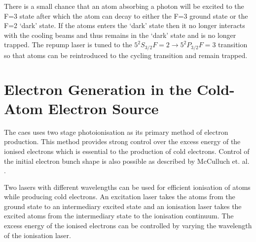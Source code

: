 There is a small chance that an atom absorbing a photon will be excited to the F=3 state after which the atom can decay to either the F=3 ground state or the F=2 `dark' state. If the atoms enters the `dark' state then it no longer interacts with the cooling beams and thus remains in the `dark' state and is no longer trapped. The repump laser is tuned to the $5 ^2 S_{3/2} F=2\rightarrow5 ^2 P_{3/2} F=3$ transition so that atoms can be reintroduced to the cycling transition and remain trapped.

\section{Electron Generation in the Cold-Atom Electron Source}
The \gls{caes} uses two stage photoionisation as its primary method of electron production. This method provides strong control over the excess energy of the ionised electrons which is essential to the production of cold electrons. Control of the initial electron bunch shape is also possible as described by McCulluch et. al. \cite{mcculloch_arbitrarily_2011}.

Two lasers with different wavelengths can be used for efficient ionisation of atoms while producing cold electrons. An excitation laser takes the atoms from the ground state to an intermediary excited state and an ionisation laser takes the excited atoms from the intermediary state to the ionisation continuum. The excess energy of the ionised electrons can be controlled by varying the wavelength of the ionisation laser.

